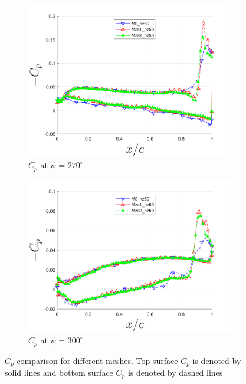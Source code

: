 \begin{figure}[H]
\begin{subfigure}[b]{0.475\textwidth}
		\includegraphics[width=1\textwidth]{figures/zonal_adapt_results/Cp_Re200k/Cp_ph_270.png}
		\caption{ $C_p$ at $\psi$ = $270^\circ$}
		\label{fig:zonal_Cp_Re200k_270}
	\end{subfigure}
	\begin{subfigure}[b]{0.475\textwidth}
		\centering
		\includegraphics[width=1\textwidth]{figures/zonal_adapt_results/Cp_Re200k/Cp_ph_300.png}
		\caption{ $C_p$ at $\psi$ = $300^\circ$}
		\label{fig:zonal_Cp_Re200k_300}
	\end{subfigure}
	\caption{$C_p$ comparison for different meshes. Top surface $C_p$ is denoted by solid lines and bottom surface $C_p$ is denoted by dashed lines}
	\label{fig:zonal_Cp_Re200k_plots}
\end{figure}